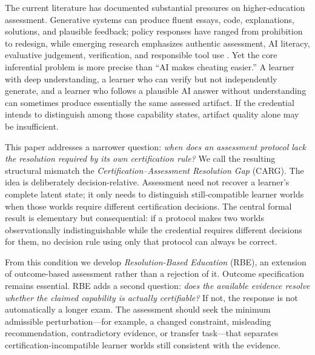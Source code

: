 \documentclass[11pt]{article}
\begin{document}
The current literature has documented substantial pressures on higher-education assessment. Generative systems can produce fluent essays, code, explanations, solutions, and plausible feedback; policy responses have ranged from prohibition to redesign, while emerging research emphasizes authentic assessment, AI literacy, evaluative judgement, verification, and responsible tool use \parencite{unesco2023guidance,luo2024policies,xia2024scoping,yusuf2024future,kofinas2025authentic,khlaif2025redesign}. Yet the core inferential problem is more precise than ``AI makes cheating easier.'' A learner with deep understanding, a learner who can verify but not independently generate, and a learner who follows a plausible AI answer without understanding can sometimes produce essentially the same assessed artifact. If the credential intends to distinguish among those capability states, artifact quality alone may be insufficient.

This paper addresses a narrower question: \emph{when does an assessment protocol lack the resolution required by its own certification rule?} We call the resulting structural mismatch the \emph{Certification--Assessment Resolution Gap} (CARG). The idea is deliberately decision-relative. Assessment need not recover a learner's complete latent state; it only needs to distinguish still-compatible learner worlds when those worlds require different certification decisions. The central formal result is elementary but consequential: if a protocol makes two worlds observationally indistinguishable while the credential requires different decisions for them, no decision rule using only that protocol can always be correct.

From this condition we develop \emph{Resolution-Based Education} (RBE), an extension of outcome-based assessment rather than a rejection of it. Outcome specification remains essential. RBE adds a second question: \emph{does the available evidence resolve whether the claimed capability is actually certifiable?} If not, the response is not automatically a longer exam. The assessment should seek the minimum admissible perturbation---for example, a changed constraint, misleading recommendation, contradictory evidence, or transfer task---that separates certification-incompatible learner worlds still consistent with the evidence.
\end{document}
